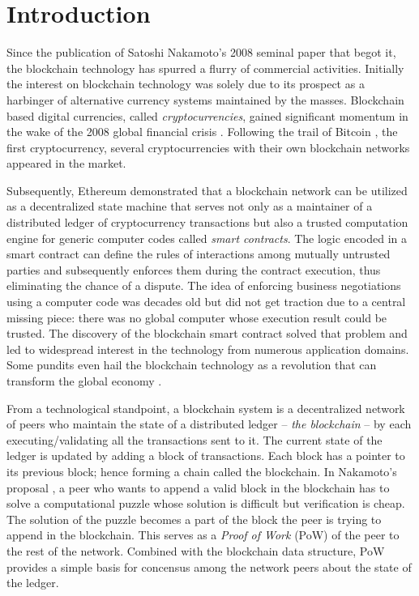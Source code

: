 \section{Introduction}
Since the publication of Satoshi Nakamoto's 2008 seminal paper \cite{bitcoin} that begot it, the blockchain technology has spurred a flurry of commercial activities. Initially the interest on blockchain technology was solely due to its prospect as a harbinger of alternative currency systems maintained by the masses. Blockchain based digital currencies, called \textit{cryptocurrencies}, gained significant momentum in the wake of the 2008 global financial crisis \cite{fincrisis}. Following the trail of Bitcoin \cite{bitcoin}, the first cryptocurrency, several cryptocurrencies \cite{bitcoinCash} \cite{David:2018:DCW:3208446} \cite{Takashima:2018:LUG:3235215} \cite{dogecoin} \cite{neo} with their own blockchain networks appeared in the market.
 
Subsequently, Ethereum \cite{Wood2014EthereumAS} demonstrated that a blockchain network can be utilized as a decentralized state machine that serves not only as a maintainer of a distributed ledger of cryptocurrency transactions but also a trusted computation engine for generic computer codes called \textit{smart contracts}. The logic encoded in a smart contract can define the rules of interactions among mutually untrusted parties and subsequently enforces them during the contract execution, thus eliminating the chance of a dispute. The idea of enforcing business negotiations using a computer code was decades old \cite{FM548} but did not get traction due to a central missing piece: there was no global computer whose execution result could be trusted. The discovery of the blockchain smart contract solved that problem and led to widespread interest in the technology from numerous application domains. Some pundits even hail the blockchain technology as a revolution that can transform the global economy \cite{blockchainRevolution1} \cite{blockchainRevolution2}.

From a technological standpoint, a blockchain system is a decentralized network of peers who maintain the state of a distributed ledger -- \textit{the blockchain} -- by each executing/validating all the transactions sent to it. The current state of the ledger is updated by adding a block of transactions. Each block has a pointer to its previous block; hence forming a chain called the blockchain. In Nakamoto's proposal \cite{bitcoin}, a peer who wants to append a valid block in the blockchain has to solve a computational puzzle whose solution is difficult but verification is cheap. The solution of the puzzle becomes a part of the block the peer is trying to append in the blockchain. This serves as a \textit{Proof of Work} (PoW) \cite{Back02hashcash} of the peer to the rest of the network. Combined with the blockchain data structure, PoW provides a simple basis for concensus \cite{Barborak:1993:CPF:152610.152612} among the network peers about the state of the ledger.

